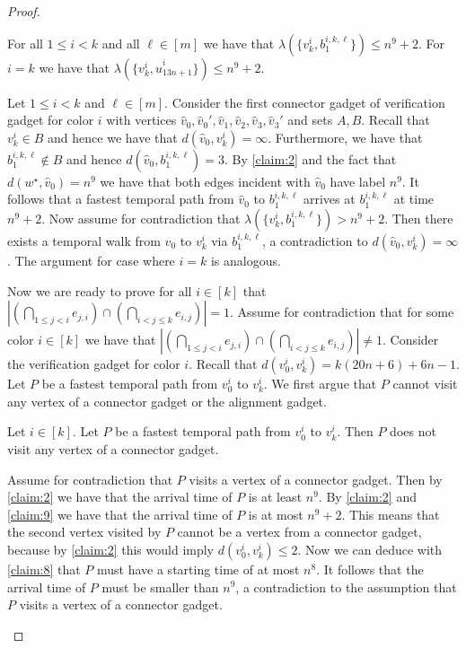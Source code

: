 \documentclass[a4paper,UKenglish,cleveref, autoref, thm-restate]{lipics-v2021}
\begin{document}
\begin{proof}
\begin{claim}\label{claim:9}
    For all $1\le i< k$ and all $\ell\in[m]$ we have that $\lambda(\{v_k^i,b^{i,k,\ell}_{1}\})\le n^9+2$.
    For $i=k$ we have that $\lambda(\{v_{k}^i,\hat{u}^i_{13n+1}\})\le n^9+2$.
%
\end{claim}
\begin{claimproof}
    Let $1\le i< k$ and $\ell\in[m]$.
    Consider the first connector gadget of verification gadget for color $i$ with vertices $\hat{v}_0,\hat{v}_0',\hat{v}_1,\hat{v}_2,\hat{v}_3,\hat{v}_3'$ and sets $A,B$. Recall that $v_k^i\in B$ and hence we have that $d(\hat{v}_0,v_k^i)=\infty$. Furthermore, we have that $b^{i,k,\ell}_{1}\notin B$ and hence $d(\hat{v}_0,b^{i,k,\ell}_{1})=3$. By \cref{claim:2} and the fact that $d(w^\star,\hat{v}_0)=n^9$ we have that both edges incident with $\hat{v}_0$ have label $n^9$. It follows that a fastest temporal path from $\hat{v}_0$ to $b^{i,k,\ell}_{1}$ arrives at $b^{i,k,\ell}_{1}$ at time $n^9+2$. Now assume for contradiction that $\lambda(\{v_k^i,b^{i,k,\ell}_{1}\})> n^9+2$. Then there exists a temporal walk from $\hat{v}_0$ to $v_k^i$ via $b^{i,k,\ell}_{1}$, a contradiction to $d(\hat{v}_0,v_k^i)=\infty$.
    The argument for case where $i=k$ is analogous.
\end{claimproof}

Now we are ready to prove for all $i\in [k]$ that $|(\bigcap_{1\le j<i} e_{j,i}) \cap (\bigcap_{i<j\le k} e_{i,j})|=1$. Assume for contradiction that for some color $i\in[k]$ we have that $|(\bigcap_{1\le j<i} e_{j,i}) \cap (\bigcap_{i<j\le k} e_{i,j})|\neq 1$. 
Consider the verification gadget for color $i$. Recall that $d(v_0^i,v_k^i)=k(20n+6)+6n-1$. Let $P$ be a fastest temporal path from $v_0^i$ to $v_k^i$.
We first argue that $P$ cannot visit any vertex of a connector gadget or the alignment gadget. 

\begin{claim}\label{claim:10}
Let $i\in[k]$. Let $P$ be a fastest temporal path from $v_0^i$ to $v_k^i$. Then $P$ does not visit any vertex of a connector gadget.
\end{claim}
\begin{claimproof}
Assume for contradiction that $P$ visits a vertex of a connector gadget. Then by \cref{claim:2} we have that the arrival time of $P$ is at least $n^9$. By \cref{claim:2} and \cref{claim:9} we have that the arrival time of $P$ is at most $n^9+2$. This means that the second vertex visited by $P$ cannot be a vertex from a connector gadget, because by \cref{claim:2} this would imply $d(v_0^i,v_k^i)\le 2$. Now we can deduce with \cref{claim:8} that $P$ must have a starting time of at most $n^8$. It follows that the arrival time of $P$ must be smaller than $n^9$, a contradiction to the assumption that $P$ visits a vertex of a connector gadget. 
\end{claimproof}


\end{proof}
\end{document}
